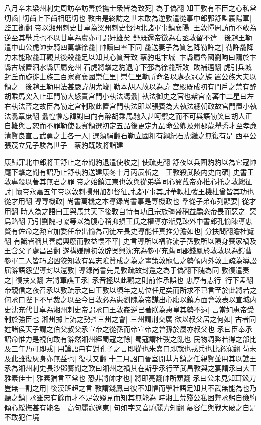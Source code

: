 八月辛未梁州刺史周訪卒訪善於撫士衆皆為致死|{
	為于偽翻}
知王敦有不臣之心私常切齒|{
	切齒上下齒相磨切也}
敦由是終訪之世未敢為逆敦遣從事中郎郭舒監襄陽軍|{
	監工銜翻}
帝以湘州刺史甘卓為梁州刺史督沔北諸軍事鎮襄陽|{
	王敦憚周訪而不敢為逆至其舉兵也不以甘卓為虞亦可謂奸雄矣}
舒既還帝徵為右丞敦留不遣　後趙王勒遣中山公虎帥步騎四萬擊徐龕|{
	帥讀曰率下同}
龕送妻子為質乞降勒許之|{
	勒許龕降力未能取龕耳觀其後殺龕足以知其心質音致}
蔡豹屯卞城|{
	卞縣屬魯國劉昫曰隋於卞縣古城置泗水縣唐屬兖州}
石虎將擊之豹退守下邳為徐龕所敗|{
	敗補邁翻}
虎引兵城封丘而旋徙士族三百家寘襄國崇仁里|{
	崇仁里勒所命名以處衣冠之族}
置公族大夫以領之　後趙王勒用法甚嚴諱胡尤峻|{
	勒本胡人故以為諱}
宫殿既成初有門戶之禁有醉胡乘馬突入止車門勒大怒責宫門小執法馮翥|{
	執法御史之官也紫宫南蕃中二星曰左右執法晉之故臣為勒定宫制取此置宫門執法即以張賓為大執法總朝政故宫門置小執法翥章庶翻}
翥惶懼忘諱對曰向有醉胡乘馬馳入甚呵禦之而不可與語勒笑曰胡人正自難與言恕而不罪勒使張賓領選初定五品後更定九品命公卿及州郡歲舉秀才至孝亷清賢良直言武勇之士各一人|{
	選須絹翻石勒立國粗有綱紀石虎繼之無復有是}
西平公張茂立兄子駿為世子　蔡豹既敗將詣建

康歸罪北中郎將王舒止之帝聞豹退遣使收之|{
	使疏吏翻}
舒夜以兵圍豹豹以為它寇帥麾下擊之聞有詔乃止舒執豹送建康冬十月丙辰斬之　王敦殺武陵内史向碩|{
	史書王敦專殺以著其無君之罪}
帝之始鎮江東也敦與從弟導同心翼戴帝亦推心托之敦總征討|{
	懷帝永嘉五年帝以敦刺揚州加都督征討諸軍事其討華軼杜弢王機杜曾皆其功也從才用翻}
導專機政|{
	尚書萬機之本導録尚書事是專機政也}
羣從子弟布列顯要|{
	從才用翻}
時人為之語曰王與馬共天下後敦自恃有功且宗族彊盛稍益驕恣帝畏而惡之|{
	惡烏路翻}
乃引劉隗刁協等以為腹心稍抑損王氏之權導亦漸見疎外中書郎孔愉陳導忠賢有佐命之勲宜加委任帝出愉為司徒左長史導能任真推分澹如也|{
	分扶問翻澹杜覽翻}
有識皆稱其善處興廢而敦益懷不平|{
	史言導所以福祚流子孫敦所以隕身喪家禍及王含父子處昌呂翻}
遂構嫌隙初敦辟吳興沈充為參軍充薦同郡錢鳳於敦敦以為鎧曹參軍二人皆巧諂凶狡知敦有異志隂贊成之為之畫策敦寵信之勢傾内外敦上疏為導訟屈辭語怨望導封以還敦|{
	導録尚書先見敦疏故封還之為于偽翻下隗為同}
敦復遣奏之|{
	復扶又翻}
左將軍譙王氶|{
	氶音拯以此觀之則前作承誤也}
忠厚有志行|{
	行下孟翻}
帝親信之夜召氶以敦疏示之曰王敦以頃年之功位任足矣而所求不已言至於此將若之何氶曰陛下不早裁之以至今日敦必為患劉隗為帝謀出心腹以鎮方面會敦表以宣城内史沈充代甘卓為湘州刺史帝謂氶曰王敦姦逆已著朕為惠皇其勢不遠|{
	言當如惠帝受制於強臣也}
湘州據上流之勢控三州之會|{
	三州謂荆交廣}
欲以叔父居之何如|{
	古者同姓諸侯天子謂之伯父叔父氶宣帝之從孫而帝宣帝之曾孫於屬亦叔父也}
氶曰臣奉承詔命惟力是視何敢有辭然湘州經蜀寇之餘|{
	蜀寇謂杜弢之亂也}
民物凋弊若得之部比及三年乃可即戎|{
	用論語冉有對孔子之言即從也朱熹曰即就也戎兵也比必寐翻}
苟未及此雖復灰身亦無益也|{
	復扶又翻}
十二月詔曰晉室開基方鎮之任親賢並用其以譙王氶為湘州刺史長沙鄧騫聞之歎曰湘州之禍其在斯乎氶行至武昌敦與之宴謂氶曰大王雅素佳士|{
	雅素猶言平常也}
恐非將帥才也|{
	將即亮翻帥所類翻}
氶曰公未見知耳鈆刀豈無一割之用|{
	後漢班超之言}
敦謂錢鳳曰彼不知懼而學壯語足知其不武無能為也乃聽之鎮|{
	氶雖忠有餘而才不足敦窺見而知其無能為}
時湘土荒殘公私困弊氶躬自儉約傾心綏撫甚有能名　高句麗寇遼東|{
	句如字又音駒麗力知翻}
慕容仁與戰大破之自是不敢犯仁境

